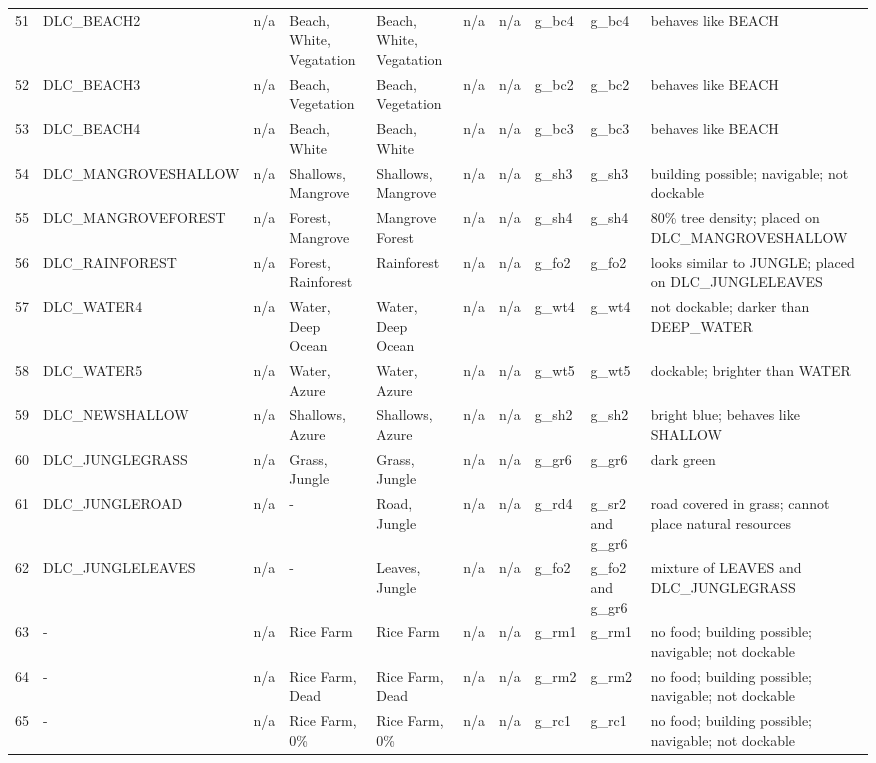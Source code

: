 \begin{landscape}
\begin{longtable}{@{}p{5mm}|p{25mm}p{23mm}|p{14mm}p{14mm}p{14mm}p{14mm}|p{10mm}p{15mm}|p{45mm}@{}}
            51	& DLC\_BEACH2	& n/a	& Beach, White, Vegatation	& Beach, White, Vegatation	& n/a	& n/a	& g\_bc4	& g\_bc4		& behaves like BEACH \\
            52	& DLC\_BEACH3	& n/a	& Beach, Vegetation	& Beach, Vegetation	& n/a	& n/a	& g\_bc2	& g\_bc2		& behaves like BEACH \\
            53	& DLC\_BEACH4	& n/a	& Beach, White	& Beach, White	& n/a	& n/a	& g\_bc3	& g\_bc3		& behaves like BEACH \\
            54	& DLC\_MANGROVESHALLOW	& n/a	& Shallows, Mangrove	& Shallows, Mangrove	& n/a	& n/a	& g\_sh3	& g\_sh3		& building possible; navigable; not dockable \\
            55	& DLC\_MANGROVEFOREST	& n/a	& Forest, Mangrove	& Mangrove Forest	& n/a	& n/a	& g\_sh4	& g\_sh4		& 80\% tree density; placed on DLC\_MANGROVESHALLOW \\
            56	& DLC\_RAINFOREST	& n/a	& Forest, Rainforest	& Rainforest	& n/a	& n/a	& g\_fo2	& g\_fo2		& looks similar to JUNGLE; placed on DLC\_JUNGLELEAVES \\
            57	& DLC\_WATER4	& n/a	& Water, Deep Ocean	& Water, Deep Ocean	& n/a	& n/a	& g\_wt4	& g\_wt4		& not dockable; darker than DEEP\_WATER \\
            58	& DLC\_WATER5	& n/a	& Water, Azure	& Water, Azure	& n/a	& n/a	& g\_wt5	& g\_wt5		& dockable; brighter than WATER \\
            59	& DLC\_NEWSHALLOW	& n/a	& Shallows, Azure	& Shallows, Azure	& n/a	& n/a	& g\_sh2	& g\_sh2		& bright blue; behaves like SHALLOW \\
            60	& DLC\_JUNGLEGRASS	& n/a	& Grass, Jungle	& Grass, Jungle	& n/a	& n/a	& g\_gr6	& g\_gr6		& dark green \\
            61	& DLC\_JUNGLEROAD	& n/a	& -	& Road, Jungle	& n/a	& n/a	& g\_rd4	& g\_sr2 and g\_gr6		& road covered in grass; cannot place natural resources \\
            62	& DLC\_JUNGLELEAVES	& n/a	& -	& Leaves, Jungle	& n/a	& n/a	& g\_fo2	& g\_fo2 and g\_gr6		& mixture of LEAVES and DLC\_JUNGLEGRASS \\
            63	& -	& n/a	& Rice Farm	& Rice Farm	& n/a	& n/a	& g\_rm1	& g\_rm1		& no food; building possible; navigable; not dockable \\
            64	& -	& n/a	& Rice Farm, Dead	& Rice Farm, Dead	& n/a	& n/a	& g\_rm2	& g\_rm2		& no food; building possible; navigable; not dockable \\
            65	& -	& n/a	& Rice Farm, 0\%	& Rice Farm, 0\%	& n/a	& n/a	& g\_rc1	& g\_rc1		& no food; building possible; navigable; not dockable \\

\end{longtable}
\end{landscape}
